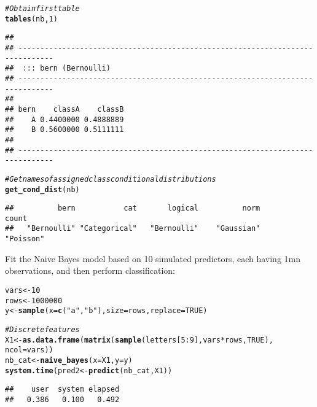 \documentclass{article}\usepackage[]{graphicx}\usepackage[]{color}
\makeatletter
\newcommand{\hlnum}[1]{\textcolor[rgb]{0.686,0.059,0.569}{#1}}%
\newcommand{\hlstr}[1]{\textcolor[rgb]{0.192,0.494,0.8}{#1}}%
\newcommand{\hlcom}[1]{\textcolor[rgb]{0.678,0.584,0.686}{\textit{#1}}}%
\newcommand{\hlopt}[1]{\textcolor[rgb]{0,0,0}{#1}}%
\newcommand{\hlstd}[1]{\textcolor[rgb]{0.345,0.345,0.345}{#1}}%
\newcommand{\hlkwb}[1]{\textcolor[rgb]{0.69,0.353,0.396}{#1}}%
\newcommand{\hlkwc}[1]{\textcolor[rgb]{0.333,0.667,0.333}{#1}}%
\newcommand{\hlkwd}[1]{\textcolor[rgb]{0.737,0.353,0.396}{\textbf{#1}}}%
\newenvironment{kframe}{%
 \def\at@end@of@kframe{}%
 \ifinner\ifhmode%
  \def\at@end@of@kframe{\end{minipage}}%
  \begin{minipage}{\columnwidth}%
 \fi\fi%
 \def\FrameCommand##1{\hskip\@totalleftmargin \hskip-\fboxsep
 \colorbox{shadecolor}{##1}\hskip-\fboxsep
     \hskip-\linewidth \hskip-\@totalleftmargin \hskip\columnwidth}%
 \MakeFramed {\advance\hsize-\width
   \@totalleftmargin\z@ \linewidth\hsize
   \@setminipage}}%
 {\par\unskip\endMakeFramed%
 \at@end@of@kframe}
\newenvironment{knitrout}{}{} %
\makeatother
\begin{document}
\begin{knitrout}
\begin{kframe}
\begin{alltt}
\hlcom{# Obtain first table}
\hlkwd{tables}\hlstd{(nb,} \hlnum{1}\hlstd{)}
\end{alltt}
\begin{verbatim}
## 
## ------------------------------------------------------------------------------ 
##  ::: bern (Bernoulli) 
## ------------------------------------------------------------------------------ 
##     
## bern    classA    classB
##    A 0.4400000 0.4888889
##    B 0.5600000 0.5111111
## 
## ------------------------------------------------------------------------------
\end{verbatim}
\begin{alltt}
\hlcom{# Get names of assigned class conditional distributions}
\hlkwd{get_cond_dist}\hlstd{(nb)}
\end{alltt}
\begin{verbatim}
##          bern           cat       logical          norm         count 
##   "Bernoulli" "Categorical"   "Bernoulli"    "Gaussian"     "Poisson"
\end{verbatim}
\end{kframe}
\end{knitrout}

Fit the Naive Bayes model based on 10 simulated predictors, each having 1mn observations, and then perform classification:

\begin{knitrout}
\color{fgcolor}\begin{kframe}
\begin{alltt}
\hlstd{vars} \hlkwb{<-} \hlnum{10}
\hlstd{rows} \hlkwb{<-} \hlnum{1000000}
\hlstd{y} \hlkwb{<-} \hlkwd{sample}\hlstd{(}\hlkwc{x} \hlstd{=} \hlkwd{c}\hlstd{(}\hlstr{"a"}\hlstd{,} \hlstr{"b"}\hlstd{),} \hlkwc{size} \hlstd{=  rows,} \hlkwc{replace} \hlstd{=} \hlnum{TRUE}\hlstd{)}

\hlcom{# Discrete features}
\hlstd{X1} \hlkwb{<-} \hlkwd{as.data.frame}\hlstd{(}\hlkwd{matrix}\hlstd{(}\hlkwd{sample}\hlstd{(letters[}\hlnum{5}\hlopt{:}\hlnum{9}\hlstd{], vars} \hlopt{*} \hlstd{rows,} \hlnum{TRUE}\hlstd{),}
                           \hlkwc{ncol} \hlstd{= vars))}
\hlstd{nb_cat} \hlkwb{<-} \hlkwd{naive_bayes}\hlstd{(}\hlkwc{x} \hlstd{= X1,} \hlkwc{y} \hlstd{= y)}
\hlkwd{system.time}\hlstd{(pred2} \hlkwb{<-} \hlkwd{predict}\hlstd{(nb_cat, X1))}
\end{alltt}
\begin{verbatim}
##    user  system elapsed 
##   0.386   0.100   0.492
\end{verbatim}
\end{kframe}
\end{knitrout}
\end{document}
